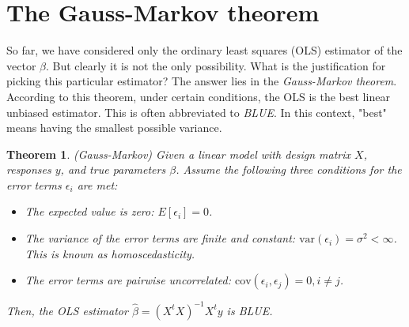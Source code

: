 \documentclass[12pt, a4paper]{article}
\newtheorem{theorem}{Theorem}
\begin{document}
\section{The Gauss-Markov theorem}
So far, we have considered only the ordinary least squares (OLS) estimator of the vector $\beta$. But clearly it is not the only possibility. What is the justification for picking this particular estimator? The answer lies in the \textit{Gauss-Markov theorem}. According to this theorem, under certain conditions, the OLS is the best linear unbiased estimator. This is often abbreviated to \textit{BLUE}. In this context, "best" means having the smallest possible variance.

\begin{theorem}
(Gauss-Markov) Given a linear model with design matrix $X$, responses $y$, and true parameters $\beta$. Assume the following three conditions for the error terms $\epsilon_i$ are met:
\begin{itemize}
\item The expected value is zero: $E[\epsilon_i]=0$.
\item The variance of the error terms are finite and constant: $\textrm{var}(\epsilon_i)=\sigma^2<\infty$. This is known as homoscedasticity.
\item The error terms are pairwise uncorrelated: $\textrm{cov}(\epsilon_i,\epsilon_j)=0, i\neq j$.
\end{itemize}
Then, the OLS estimator $\hat{\beta}=(X^t X)^{-1}X^t y$ is BLUE.
\end{theorem}
\end{document}
